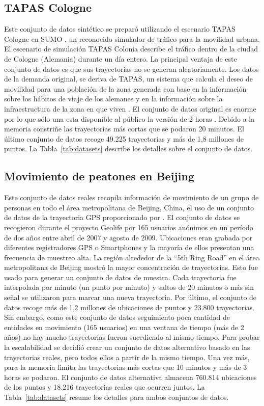 \subsection{TAPAS Cologne}

Este conjunto de datos sintético se preparó utilizando el escenario TAPAS Cologne \cite{varschen2006mikroskopische}
en SUMO \cite{krajzewicz2002sumo}, un reconocido simulador de tráfico para la movilidad urbana. El escenario de simulación 
TAPAS Colonia describe el tráfico dentro de la ciudad de Cologne (Alemania) durante un día entero. La principal ventaja de 
este conjunto de datos es que sus trayectorias no se generan aleatoriamente. Los datos de la demanda original, se deriva de TAPAS, 
un sistema que calcula el deseo de movilidad para una población de la zona generada con base en la información sobre los hábitos de viaje 
de los alemanes y en la información sobre la infraestructura de la zona en que viven \cite{MiD2002}. El conjunto de datos original 
es enorme por lo que sólo una esta disponible al público la versión de 2 horas \cite{TAPASCologne}. Debido a la memoria constriñe 
las trayectorias más cortas que se podaron 20 minutos. El último conjunto de datos recoge 49.225 trayectorias y más 
de 1,8 millones de puntos. La Tabla~\ref{tab:datasets} describe los detalles sobre el conjunto de datos.

\subsection{Movimiento de peatones en Beijing}

Este conjunto de datos reales recopila información de movimiento de un grupo de personas en todo 
el área metropolitana de Beijing, China, el uso de un conjunto de datos de la trayectoria GPS proporcionado por \cite{GeoLife}. 
El conjunto de datos se recogieron durante el proyecto Geolife por 165 usuarios anónimos en un período de dos años entre abril de 2007 y agosto de 2009. Ubicaciones eran 
grabada por diferentes registradores GPS o Smartphones y la mayoría de ellos presentan una frecuencia de muestreo alta. 
La región alrededor de la ``5th Ring Road'' en el área metropolitana de Beijing mostró la 
mayor concentración de trayectorias. Esto fue usado para generar un conjunto de datos de muestra. Cada trayectoria 
fue interpolada por minuto (un punto por minuto) y saltos de 20 minutos o más 
sin señal se utilizaron para marcar una nueva trayectoria. Por último, el conjunto de datos recoge más 
de 1,2 millones de ubicaciones de puntos y 23.800 trayectorias. Sin embargo, como este conjunto de datos seguimiento poca cantidad de
entidades en movimiento (165 usuarios) en una ventana de tiempo (más de 2 años) no hay mucho trayectorias fueron sucediendo al mismo tiempo. Para probar
la escalabilidad se decidió crear un conjunto de datos alternativo basado en las trayectorias reales, pero todos ellos a partir de la mismo tiempo. Una 
vez más, para la memoria limita las trayectorias más cortas que 10 minutos y más de 3 horas se podaron. El conjunto de datos alternativa almacena 760.814 
ubicaciones de los puntos y 18.216 trayectorias reales que ocurren juntos. La Tabla~\ref{tab:datasets} resume los detalles para ambos conjuntos de datos.


